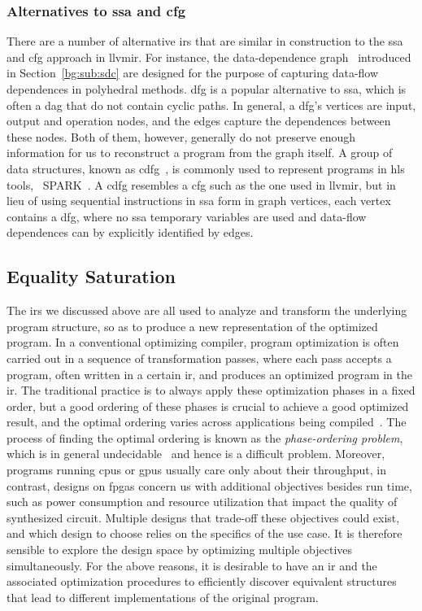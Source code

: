 \subsubsection{Alternatives to \gls{ssa} and \gls{cfg}}

There are a number of alternative \glspl{ir} that are similar in construction
to the \gls{ssa} and \gls{cfg} approach in \gls{llvmir}\@.  For instance, the
data-dependence graph~\cite{rau94} introduced in Section~\ref{bg:sub:sdc} are
designed for the purpose of capturing data-flow dependences in polyhedral
methods. \gls{dfg} is a popular alternative to \gls{ssa}, which is often a
\gls{dag} that do not contain cyclic paths.  In general, a \gls{dfg}'s vertices
are input, output and operation nodes, and the edges capture the dependences
between these nodes.  Both of them, however, generally do not preserve enough
information for us to reconstruct a program from the graph itself.  A group of
data structures, known as \gls{cdfg}~\cite{orailoglu86}, is commonly used to
represent programs in \gls{hls} tools, \eg~SPARK~\cite{gupta04}.  A \gls{cdfg}
resembles a \gls{cfg} such as the one used in \gls{llvmir}, but in lieu of
using sequential instructions in \gls{ssa} form in graph vertices, each vertex
contains a \gls{dfg}, where no \gls{ssa} temporary variables are used and
data-flow dependences can by explicitly identified by edges.


\subsection{Equality Saturation}
\label{bg:sub:equality_saturation}

The \glspl{ir} we discussed above are all used to analyze and transform the
underlying program structure, so as to produce a new representation of the
optimized program.  In a conventional optimizing compiler, program optimization
is often carried out in a sequence of transformation passes, where each pass
accepts a program, often written in a certain \gls{ir}, and produces an
optimized program in the \gls{ir}\@.  The traditional practice is to always
apply these optimization phases in a fixed order, but a good ordering of these
phases is crucial to achieve a good optimized result, and the optimal ordering
varies across applications being compiled~\cite{almagor04}.  The process of
finding the optimal ordering is known as the \emph{phase-ordering problem},
which is in general undecidable~\cite{touati06} and hence is a difficult
problem.  Moreover, programs running \glspl{cpu} or \glspl{gpu} usually care
only about their throughput, in contrast, designs on \glspl{fpga} concern us
with additional objectives besides run time, such as power consumption and
resource utilization that impact the quality of synthesized circuit.  Multiple
designs that trade-off these objectives could exist, and which design to
choose relies on the specifics of the use case.  It is therefore sensible to
explore the design space by optimizing multiple objectives simultaneously.
For the above reasons, it is desirable to have an \gls{ir} and the associated
optimization procedures to efficiently discover equivalent structures that lead
to different implementations of the original program.

